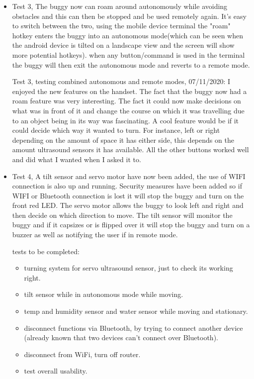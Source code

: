 \documentclass[8pt, a4paper]{article}
\begin{document}
\begin{itemize}
\item Test 3, The buggy now can roam around autonomously while avoiding obstacles and this can then be stopped and be used remotely again. It’s easy to switch between the two, using the mobile device terminal the "roam" hotkey enters the buggy into an autonomous mode(which can be seen when the android device is tilted on a landscape view and the screen will show more potential hotkeys). when any button/command is used in the terminal the buggy will then exit the autonomous mode and reverts to a remote mode. 

Test 3, testing combined autonomous and remote modes, 07/11/2020: I enjoyed the new features on the handset. The fact that the buggy now had a roam feature was very interesting. The fact it could now make decisions on what was in front of it and change the course on which it was travelling due to an object being in its way was fascinating. A cool feature would be if it could decide which way it wanted to turn. For instance, left or right depending on the amount of space it has either side, this depends on the amount ultrasound sensors it has available. All the other buttons worked well and did what I wanted when I asked it to. 

\item Test 4, A tilt sensor and servo motor have now been added, the use of WIFI connection is also up and running. Security measures have been added so if WIFI or Bluetooth connection is lost it will stop the buggy and turn on the front red LED. The servo motor allows the buggy to look left and right and then decide on which direction to move. The tilt sensor will monitor the buggy and if it capsizes or is flipped over it will stop the buggy and turn on a buzzer as well as notifying the user if in remote mode. 

tests to be completed:
\begin{itemize}
\item turning system for servo ultrasound sensor, just to check its working right.
\item tilt sensor while in autonomous mode while moving. 
\item temp and humidity sensor and water sensor while moving and stationary. 
\item disconnect functions via Bluetooth, by trying to connect another device (already known that two devices can’t connect over Bluetooth).
\item disconnect from WiFi, turn off router. 
\item test overall usability.
\end{itemize}


\end{itemize}
\end{document}

